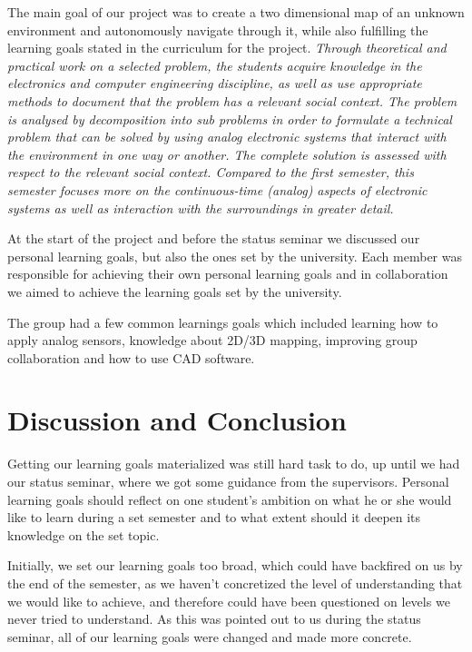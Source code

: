 The main goal of our project was to create a two dimensional map of an unknown environment and autonomously navigate through it, while also fulfilling the learning goals stated in the curriculum for the project.
\textit{Through theoretical and practical work on a selected problem, the
students acquire knowledge in the electronics and computer engineering
discipline, as well as use appropriate methods to document that the
problem has a relevant social context. The problem is analysed by
decomposition into sub problems in order to formulate a technical
problem that can be solved by using analog electronic systems that
interact with the environment in one way or another. The complete
solution is assessed with respect to the relevant social context. Compared
to the first semester, this semester focuses more on the continuous-time
(analog) aspects of electronic systems as well as interaction with the
surroundings in greater detail.}

At the start of the project and before the status seminar we discussed our personal learning goals, but also the ones set by the university. Each member was responsible for achieving their own personal learning goals and in collaboration we aimed to achieve the learning goals set by the university.

The group had a few common learnings goals which included learning how to apply analog sensors, knowledge about 2D/3D mapping, improving group collaboration and how to use CAD software.

\section{Discussion and Conclusion}

Getting our learning goals materialized was still hard task to do, up until we had our status seminar, where we got some guidance from the supervisors. Personal learning goals should reflect on one student's ambition on what he or she would like to learn during a set semester and to what extent should it deepen its knowledge on the set topic. 

Initially, we set our learning goals too broad, which could have backfired on us by the end of the semester, as we haven't concretized the level of understanding that we would like to achieve, and therefore could have been questioned on levels we never tried to understand. As this was pointed out to us during the status seminar, all of our learning goals were changed and made more concrete. 


